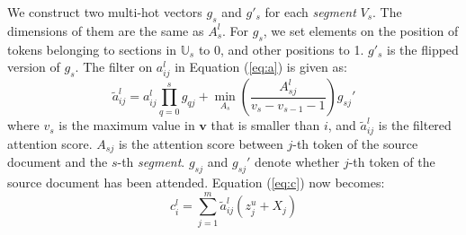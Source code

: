 We construct two multi-hot vectors $g_{s}$ and $g'_{s}$ for each \textit{segment} $V_{s}$.
The dimensions of them are the
same as $A_{s}^{l}$. For $g_{s}$, we set elements on the position of tokens
belonging to sections in $\mathbb{U}_{s}$ to 0, and other
positions to 1. $g'_{s}$ is the flipped version of $g_{s}$. 
The filter on $a_{ij}^{l}$ in Equation (\ref{eq:a}) is given as:
\begin{equation}
	\tilde{a}_{ij}^{l} = a_{ij}^{l}\prod_{q=0}^{s}g_{qj} + \min \limits_{A_{s}}\left(\frac{A_{sj}^{l}}{v_{s}-v_{s-1}-1}\right)g_{sj}'
\end{equation}
where $v_{s}$ is the maximum value in 
$\mathbf{v}$ that is smaller than $i$, and $\tilde{a}_{ij}^l$ is the filtered
attention score. $A_{sj}$ is the attention score between $j$-th token
of the source document and the $s$-th \textit{segment}. 
$g_{sj}$ and $g_{sj}'$ denote whether $j$-th token
of the source document has been attended.
Equation (\ref{eq:c}) now becomes:
\begin{equation}
    c _ { i } ^ { l } = \sum _ { j = 1 } ^ { m } \tilde{a}_{ij}^{l} \left( z _ { j } ^ { u } + X_j \right)
\end{equation}



